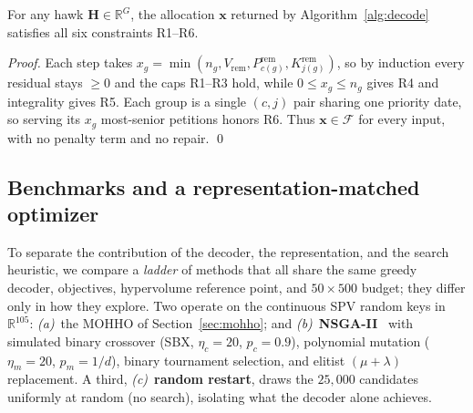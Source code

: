 \documentclass[runningheads]{llncs}
\begin{document}
\begin{proposition}
\label{prop:feas}
For any hawk $\mathbf{H}\in\mathbb{R}^{G}$, the allocation $\mathbf{x}$ returned by Algorithm~\ref{alg:decode} satisfies all six constraints R1--R6.
\end{proposition}

\begin{proof}
Each step takes $x_g=\min(n_g,V_{\text{rem}},P^{\text{rem}}_{c(g)},K^{\text{rem}}_{j(g)})$, so by induction every residual stays $\ge 0$ and the caps R1--R3 hold, while $0\le x_g\le n_g$ gives R4 and integrality gives R5. Each group is a single $(c,j)$ pair sharing one priority date, so serving its $x_g$ most-senior petitions honors R6. Thus $\mathbf{x}\in\mathcal{F}$ for every input, with no penalty term and no repair. \qed
\end{proof}

\subsection{Benchmarks and a representation-matched optimizer}
\label{sec:nsga}

To separate the contribution of the decoder, the representation, and the search heuristic, we compare a \emph{ladder} of methods that all share the same greedy decoder, objectives, hypervolume reference point, and $50\times500$ budget; they differ only in how they explore. Two operate on the continuous SPV random keys in $\mathbb{R}^{105}$:
\emph{(a)}~the MOHHO of Section~\ref{sec:mohho}; and
\emph{(b)}~\textbf{NSGA-II}~\cite{deb} with simulated binary crossover (SBX, $\eta_c=20$, $p_c=0.9$), polynomial mutation ($\eta_m=20$, $p_m=1/d$), binary tournament selection, and elitist $(\mu+\lambda)$ replacement.
A third, \emph{(c)}~\textbf{random restart}, draws the $25{,}000$ candidates uniformly at random (no search), isolating what the decoder alone achieves.
\end{document}
